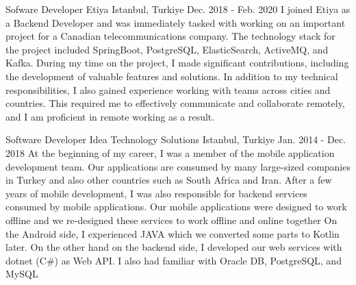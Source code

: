 \begin{cventries}
    \cventry
    {Sofware Developer} %
    {Etiya} %
    {Istanbul, Turkiye} %
    {Dec. 2018 - Feb. 2020} %
    {
        I joined Etiya as a Backend Developer and was immediately tasked with working on an important project for a Canadian telecommunications company. The technology stack for the project included SpringBoot, PostgreSQL, ElasticSearch, ActiveMQ, and Kafka.
    During my time on the project, I made significant contributions, including the development of valuable features and solutions.
    In addition to my technical responsibilities, I also gained experience working with teams across cities and countries. This required me to effectively communicate and collaborate remotely, and I am proficient in remote working as a result.
    }

    \cventry
    {Software Developer} %
    {Idea Technology Solutions} %
    {Istanbul, Turkiye} %
    {Jan. 2014 - Dec. 2018} %
    {
        At the beginning of my career, I was a member of the mobile application development team. Our applications are consumed by many large-sized companies in Turkey and also other countries such as South Africa and Iran.
    After a few years of mobile development, I was also responsible for backend services consumed by mobile applications. Our mobile applications were designed to work offline and we re-designed these services to work offline and online together
    On the Android side, I experienced JAVA which we converted some parts to Kotlin later. On the other hand on the backend side, I developed our web services with dotnet (C\#) as Web API. I also had familiar with Oracle DB, PostgreSQL, and MySQL
    }

\end{cventries}
\newpage